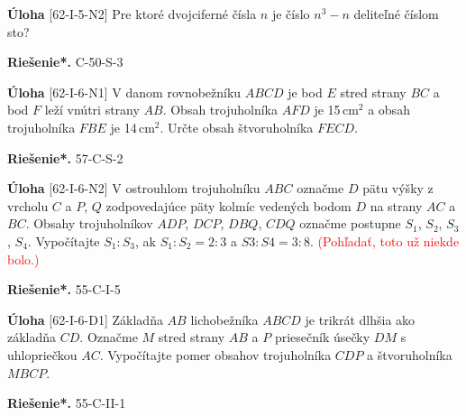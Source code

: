 \documentclass{article}
\newcommand{\rieh}{\textbf{Riešenie*.} }
\newcommand\todo[1]{\noindent\textcolor{red}{(#1)}}
\newcommand{\problem}[4]{
  \begin{tcolorbox}[breakable,notitle,boxrule=0pt,colback=light-gray,colframe=light-gray]
    \textbf{Úloha}
    [#1] #3
  \end{tcolorbox}
  \noindent#4
}
\begin{document}
\problem{62-I-5-N2}{}{
Pre ktoré dvojciferné čísla $n$ je číslo $n^3-n$ deliteľné číslom sto?
}{
\rieh C-50-S-3
}


\problem{62-I-6-N1}{}{
V danom rovnobežníku $ABCD$ je bod $E$ stred strany $BC$ a bod $F$ leží vnútri strany $AB$. Obsah trojuholníka $AFD$ je 15\,cm$^2$ a obsah trojuholníka $FBE$ je 14\,cm$^2$. Určte obsah štvoruholníka $FECD$.
}{
\rieh 57-C-S-2
}


\problem{62-I-6-N2}{}{
V ostrouhlom trojuholníku $ABC$ označme $D$ pätu výšky z vrcholu $C$ a $P$, $Q$ zodpovedajúce päty kolmíc vedených bodom $D$ na strany $AC$ a $BC$. Obsahy trojuholníkov $ADP$, $DCP$, $DBQ$, $CDQ$ označme postupne $S_1$, $S_2$, $S_3$, $S_4$. Vypočítajte $S_1 : S_3$, ak $S_1 : S_2 = 2 : 3$ a $S3 : S4 = 3 : 8$. \todo{Pohľadať, toto už niekde bolo.}
}{
\rieh 55-C-I-5
}


\problem{62-I-6-D1}{}{
Základňa $AB$ lichobežníka $ABCD$ je trikrát dlhšia ako základňa $CD$. Označme $M$ stred strany $AB$ a $P$ priesečník úsečky $DM$ s uhlopriečkou $AC$. Vypočítajte pomer obsahov trojuholníka $CDP$ a štvoruholníka $MBCP$.
}{
\rieh 55-C-II-1
}
\end{document}
